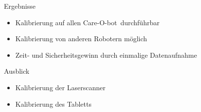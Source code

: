 \documentclass[final]{beamer}
\newcommand{\cob}{Care-O-bot\textsuperscript{\textregistered}}
\begin{document}
\begin{frame}
\begin{columns}[t]
\begin{column}{.3\linewidth}
      \begin{block}{Ergebnisse}
        \begin{itemize}
          \item Kalibrierung auf allen \cob\ durchführbar
          \item Kalibrierung von anderen Robotern möglich
          \item Zeit- und Sicherheitsgewinn durch einmalige Datenaufnahme
        \end{itemize}

      \end{block}

      \begin{block}{Ausblick}
        \begin{itemize}
          \item Kalibrierung der Laserscanner
          \item Kalibrierung des Tabletts
        \end{itemize}
      \end{block}

    \end{column}
  \end{columns}

\end{frame}
\end{document}
